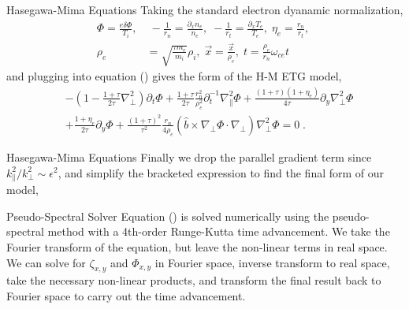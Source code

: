 \documentclass[aspectratio=43]{beamer}
\begin{document}
   \begin{frame}{Hasegawa-Mima Equations}
      \quad Taking the standard electron dyanamic normalization,
      \begin{equation}
      \begin{aligned}
         \Phi    = \frac{e\delta\Phi}{T_i},&\; -\frac{1}{r_n}=\frac{\partial_x n_e}{n_e},\; -\frac{1}{r_t}=\frac{\partial_x T_e}{T_e},\; \eta_e=\frac{r_n}{r_t},\; \\
         \rho_e &= \sqrt{\frac{\tau m_e}{m_i}}\rho_i,\; \vec{x} = \frac{\vec{x}}{\rho_e},\; t=\frac{\rho_e}{r_n}\omega_{ce}t
      \end{aligned}
      \end{equation}
   and plugging into equation () gives the form of the H-M ETG model,
      \begin{equation}
      \begin{aligned}
         &-(1-\frac{1+\tau}{2\tau}\nabla_{\perp}^2)\partial_t\Phi + \frac{1+\tau}{2\tau}\frac{r_n^2}{\rho_e^2}\partial_t^{-1}\nabla_{\parallel}^2\Phi
          + \frac{(1+\tau)(1+\eta_e)}{4\tau}\partial_y\nabla_{\perp}^2\Phi \\
         &+ \frac{1+\eta_e}{2\tau}\partial_y\Phi + \frac{(1+\tau)^2}{\tau^2}\frac{r_n}{4\rho_e}(\hat{b}\times\nabla_{\perp}\Phi\cdot\nabla_{\perp})\nabla_{\perp}^2\Phi = 0\;.
      \end{aligned}
      \end{equation}
   \end{frame}

   \begin{frame}{Hasegawa-Mima Equations}
      \quad Finally we drop the parallel gradient term since $k_{\parallel}^2/k_{\perp}^2 \sim \epsilon^2$, and simplify the bracketed expression to find the final
      form of our model,
   \end{frame}

   \begin{frame}{Pseudo-Spectral Solver}
      \quad Equation () is solved numerically using the pseudo-spectral method with a 4th-order Runge-Kutta time advancement. We take the Fourier transform of the equation, but
   leave the non-linear terms in real space. We can solve for $\zeta_{x,y}$ and $\Phi_{x,y}$ in Fourier space, inverse transform to real space, take the necessary non-linear products,
   and transform the final result back to Fourier space to carry out the time advancement.
   \end{frame}
\end{document}
